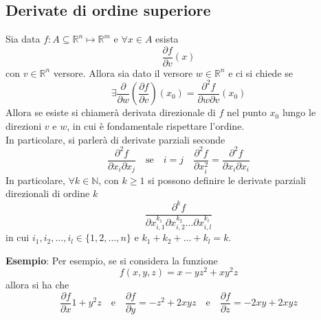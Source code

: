 \documentclass[a4paper]{extarticle}
\begin{document}
\subsection{Derivate di ordine superiore}
Sia data $f : A \subseteq \mathbb{R}^n \longmapsto \mathbb{R}^m$ e $\forall x \in A$ esista
\[\dfrac{\partial f}{\partial v}(x)\]
con $v \in \mathbb{R}^n$ versore. Allora sia dato il versore $w \in \mathbb{R}^n$ e ci si chiede se
\[\exists \dfrac{\partial }{\partial w} \left(\frac{\partial f}{\partial v}\right)(x_0) = \dfrac{\partial^2 f}{\partial w \partial v}(x_0)\]
Allora se esiste si chiamerà derivata direzionale di $f$ nel punto $x_0$ lungo le direzioni $v$ e $w$, in cui è fondamentale rispettare l'ordine.\\
In particolare, si parlerà di derivate parziali seconde
\[\dfrac{\partial^2 f}{\partial x_i \partial x_j} \hspace{1em} \text{se} \hspace{1em} i=j \hspace{1em} \dfrac{\partial^2 f}{\partial x_i^2} = \dfrac{\partial^2 f}{\partial x_i \partial x_i}\]
In particolare, $\forall k \in \mathbb{N}$, con $k \geq 1$ si possono definire le derivate parziali direzionali di ordine $k$
\[\dfrac{\partial^k f}{\partial x_{i,1}^{k_1} \partial x_{i,2}^{k_2} \dots \partial x_{i,l}^{k_l}}\]
in cui $i_1,i_2,\dots,i_l \in \{1,2,\dots,n\}$ e $k_1+k_2+\dots+k_l=k$.

\vspace{1em}
\noindent
\textbf{Esempio}: Per esempio, se si considera la funzione
\[f(x,y,z)=x-yz^2+xy^2z\]
allora si ha che
\[\dfrac{\partial f}{\partial x} 1+y^2z \hspace{1em} \text{e} \hspace{1em} \dfrac{\partial f}{\partial y} = -z^2+2xyz \hspace{1em} \text{e} \hspace{1em} \dfrac{\partial f}{\partial z} = -2xy + 2xyz\]
\end{document}
